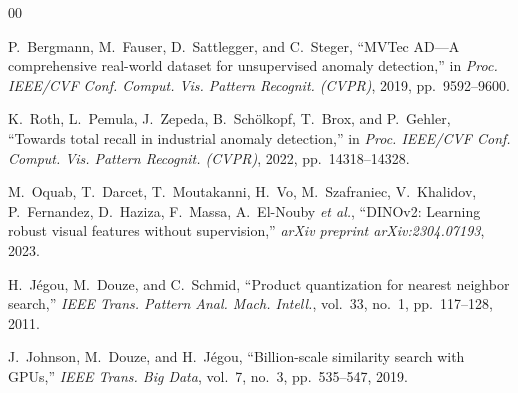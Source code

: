 \documentclass[10pt,journal,compsoc]{IEEEtran}
\begin{document}
\begin{thebibliography}{00}

P.~Bergmann, M.~Fauser, D.~Sattlegger, and C.~Steger, ``MVTec AD—A comprehensive real-world dataset for unsupervised anomaly detection,'' in \emph{Proc. IEEE/CVF Conf. Comput. Vis. Pattern Recognit. (CVPR)}, 2019, pp.~9592--9600.

K.~Roth, L.~Pemula, J.~Zepeda, B.~Sch{\"o}lkopf, T.~Brox, and P.~Gehler, ``Towards total recall in industrial anomaly detection,'' in \emph{Proc. IEEE/CVF Conf. Comput. Vis. Pattern Recognit. (CVPR)}, 2022, pp.~14318--14328.

M.~Oquab, T.~Darcet, T.~Moutakanni, H.~Vo, M.~Szafraniec, V.~Khalidov, P.~Fernandez, D.~Haziza, F.~Massa, A.~El-Nouby \emph{et al.}, ``DINOv2: Learning robust visual features without supervision,'' \emph{arXiv preprint arXiv:2304.07193}, 2023.

H.~J{\'e}gou, M.~Douze, and C.~Schmid, ``Product quantization for nearest neighbor search,'' \emph{IEEE Trans. Pattern Anal. Mach. Intell.}, vol.~33, no.~1, pp.~117--128, 2011.

J.~Johnson, M.~Douze, and H.~J{\'e}gou, ``Billion-scale similarity search with GPUs,'' \emph{IEEE Trans. Big Data}, vol.~7, no.~3, pp.~535--547, 2019.

\end{thebibliography}
\end{document}
